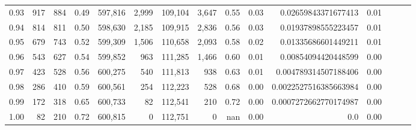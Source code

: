\begin{tabular}{rrrrrrrrrrrrrrr}
0.93 &     917 &    884 &  0.49 &  597,816 &    2,999 &  109,104 &    3,647 &  0.55 &  0.03 &    0.02659843371677413 &      0.01 \\
0.94 &     814 &    811 &  0.50 &  598,630 &    2,185 &  109,915 &    2,836 &  0.56 &  0.03 &    0.01937898555223457 &      0.01 \\
0.95 &     679 &    743 &  0.52 &  599,309 &    1,506 &  110,658 &    2,093 &  0.58 &  0.02 &    0.01335686601449211 &      0.01 \\
0.96 &     543 &    627 &  0.54 &  599,852 &      963 &  111,285 &    1,466 &  0.60 &  0.01 &    0.00854094420448599 &      0.00 \\
0.97 &     423 &    528 &  0.56 &  600,275 &      540 &  111,813 &      938 &  0.63 &  0.01 &   0.004789314507188406 &      0.00 \\
0.98 &     286 &    410 &  0.59 &  600,561 &      254 &  112,223 &      528 &  0.68 &  0.00 &  0.0022527516385663984 &      0.00 \\
0.99 &     172 &    318 &  0.65 &  600,733 &       82 &  112,541 &      210 &  0.72 &  0.00 &  0.0007272662770174987 &      0.00 \\
1.00 &      82 &    210 &  0.72 &  600,815 &        0 &  112,751 &        0 &   nan &  0.00 &                    0.0 &      0.00 \\
\bottomrule
\end{tabular}
